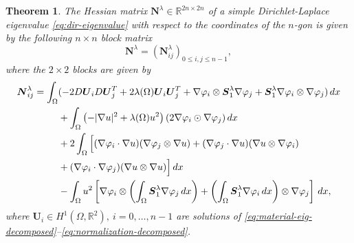 \documentclass[JEP,XML,SOM,Unicode,ThmDefs,NoFloatCountersInSection,published]{cedram}
\theoremstyle{plain}
\newtheorem{thm}{Theorem}[section]
\theoremstyle{definition}
\newcommand{\bo}[1]{{\boldsymbol#1}}
\let\Bbb\mathbb
\begin{document}
\begin{thm} The Hessian matrix $\bo N^\lambda \in \Bbb{R}^{2n\times 2n}$ of a simple Dirichlet-Laplace eigenvalue \eqref{eq:dir-eigenvalue} with respect to the coordinates of the $n$-gon is given by the following $n\times n$ block matrix
\[
\bo N^\lambda = (\bo N_{ij}^\lambda)_{0\leq i,j\leq n-1},
\]
where the $2\times 2$ blocks are given by
\begin{align}\label{eq:Hessian-lambda-block}
\bo N_{ij}^\lambda = \int_\Omega& (-2D \bo U_i D \bo U_j^T+ 2\lambda(\Omega) \bo U_i \bo U_j^T + \nabla \varphi_i \otimes \bo S_1^\lambda \nabla \varphi_j + \bo S_1^\lambda \nabla \varphi_i \otimes \nabla \varphi_j)\, dx \notag \\
& +\int_\Omega \left(-|\nabla u|^2+\lambda(\Omega) u^2\right) (2 \nabla \varphi_i \odot \nabla \varphi_j) \, dx \notag \\
& +2\int_\Omega \Big[(\nabla \varphi_i\cdot \nabla u)(\nabla \varphi_j \otimes \nabla u)+(\nabla \varphi_j \cdot \nabla u)(\nabla u \otimes \nabla \varphi_i) \\
&+(\nabla \varphi_i \cdot \nabla \varphi_j)(\nabla u \otimes \nabla u)\Big] \, dx\notag \\
& - \int_\Omega u^2\left[\nabla \varphi_i \otimes \left(\int_\Omega \bo S_1^\lambda \nabla \varphi_j \, dx \right)+
\left(\int_\Omega \bo S_1^\lambda \nabla \varphi_i\, dx\right)\otimes \nabla \varphi_j \right]\, dx, \notag
\end{align}
where $\bo U_i \in H^1(\Omega,\Bbb{R}^2),\ i=0,\dots,n-1$ are solutions of \eqref{eq:material-eig-decomposed}--\eqref{eq:normalization-decomposed}.
\label{thm:hessian-eig}
\end{thm}
\end{document}
